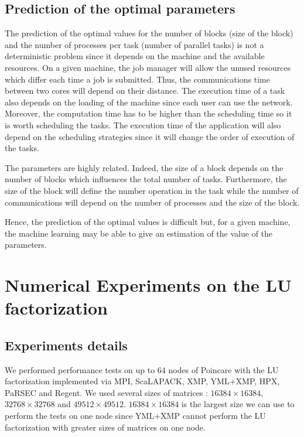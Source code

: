 \subsection{Prediction of the optimal parameters}
The prediction of the optimal values for the number of blocks (size of the block) and the number of processes per task (number of parallel tasks) is not a deterministic problem since it depends on the machine and the available resources.
On a given machine, the job manager will allow the unused resources which differ each time a job is submitted.
Thus, the communications time between two cores will depend on their distance.
The execution time of a task also depends on the loading of the machine since each user can use the network.
Moreover, the computation time has to be higher than the scheduling time so it is worth scheduling the tasks.
The execution time of the application will also depend on the scheduling strategies since it will change the order of execution of the tasks.

The parameters are highly related.
Indeed, the size of a block depends on the number of blocks which influences the total number of tasks.
Furthermore, the size of the block will define the number operation in the task while the number of communications will depend on the number of processes and the size of the block.

Hence, the prediction of the optimal values is difficult but, for a given machine, the machine learning may be able to give an estimation of the value of the parameters.

\section{Numerical Experiments on the LU factorization}
\subsection{Experiments details}
We performed performance tests on up to 64 nodes of Poincare with the LU factorization implemented via MPI, ScaLAPACK, XMP, YML+XMP, HPX, PaRSEC and Regent.
We used several sizes of matrices : $16384 \times 16384$, $32768 \times 32768$ and $49512 \times 49512$.
$16384 \times 16384$ is the largest size we can use to perform the tests on one node since YML+XMP cannot perform the LU factorization with greater sizes of matrices on one node.

